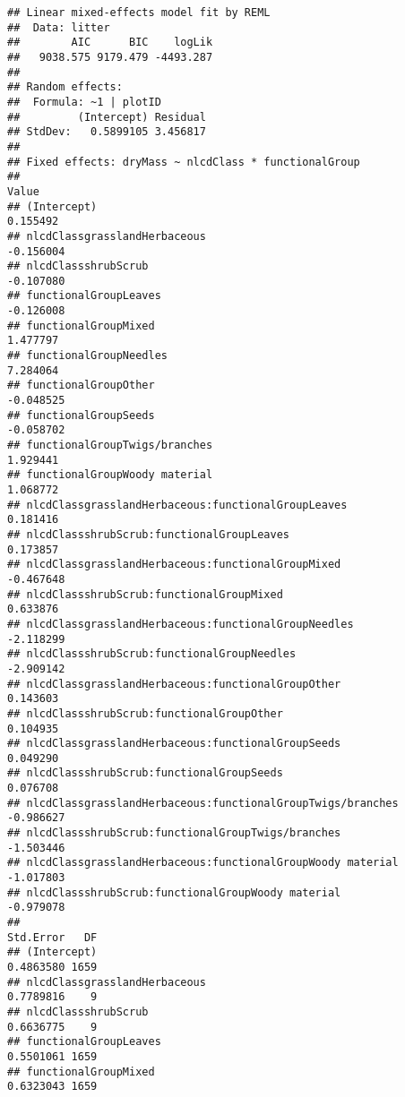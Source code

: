 \documentclass[]{article}
\begin{document}
\begin{verbatim}
## Linear mixed-effects model fit by REML
##  Data: litter 
##        AIC      BIC    logLik
##   9038.575 9179.479 -4493.287
## 
## Random effects:
##  Formula: ~1 | plotID
##         (Intercept) Residual
## StdDev:   0.5899105 3.456817
## 
## Fixed effects: dryMass ~ nlcdClass * functionalGroup 
##                                                                Value
## (Intercept)                                                 0.155492
## nlcdClassgrasslandHerbaceous                               -0.156004
## nlcdClassshrubScrub                                        -0.107080
## functionalGroupLeaves                                      -0.126008
## functionalGroupMixed                                        1.477797
## functionalGroupNeedles                                      7.284064
## functionalGroupOther                                       -0.048525
## functionalGroupSeeds                                       -0.058702
## functionalGroupTwigs/branches                               1.929441
## functionalGroupWoody material                               1.068772
## nlcdClassgrasslandHerbaceous:functionalGroupLeaves          0.181416
## nlcdClassshrubScrub:functionalGroupLeaves                   0.173857
## nlcdClassgrasslandHerbaceous:functionalGroupMixed          -0.467648
## nlcdClassshrubScrub:functionalGroupMixed                    0.633876
## nlcdClassgrasslandHerbaceous:functionalGroupNeedles        -2.118299
## nlcdClassshrubScrub:functionalGroupNeedles                 -2.909142
## nlcdClassgrasslandHerbaceous:functionalGroupOther           0.143603
## nlcdClassshrubScrub:functionalGroupOther                    0.104935
## nlcdClassgrasslandHerbaceous:functionalGroupSeeds           0.049290
## nlcdClassshrubScrub:functionalGroupSeeds                    0.076708
## nlcdClassgrasslandHerbaceous:functionalGroupTwigs/branches -0.986627
## nlcdClassshrubScrub:functionalGroupTwigs/branches          -1.503446
## nlcdClassgrasslandHerbaceous:functionalGroupWoody material -1.017803
## nlcdClassshrubScrub:functionalGroupWoody material          -0.979078
##                                                            Std.Error   DF
## (Intercept)                                                0.4863580 1659
## nlcdClassgrasslandHerbaceous                               0.7789816    9
## nlcdClassshrubScrub                                        0.6636775    9
## functionalGroupLeaves                                      0.5501061 1659
## functionalGroupMixed                                       0.6323043 1659

\end{verbatim}
\end{document}
